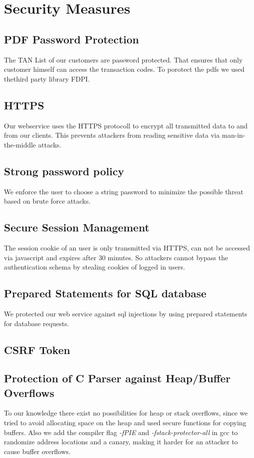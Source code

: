 \chapter{Security Measures}

\section{PDF Password Protection}
The TAN List of our customers are password protected. That ensures that only customer himself can access the transaction codes. To porotect the pdfs we used thethird party library FDPI.
\section{HTTPS}
Our webservice uses the HTTPS protocoll to encrypt all transmitted data to and from our clients.
This prevents attackers from reading sensitive data via man-in-the-middle attacks.
\section{Strong password policy}
We enforce the user to choose a string password to minimize the possible threat based on brute force attacks.
\section{Secure Session Management}
The session cookie of an user is only transmitted via HTTPS, can not be accessed via javascript and expires after 30 minutes. So attackers cannot bypass the authentication schema by stealing cookies of logged in users.
\section{Prepared Statements for SQL database}
We protected our web service against sql injections by using prepared statements for database requests.
\section{CSRF Token}
\section{Protection of C Parser against Heap/Buffer Overflows}
To our knowledge there exist no possibilities for heap or stack overflows, since we tried to avoid allocating space on the heap and used secure functions for copying buffers. Also we add the compiler flag \textit{-fPIE} and \textit{-fstack-protector-all} in gcc to randomize address locations and a canary, making it harder for an attacker to cause buffer overflows.
